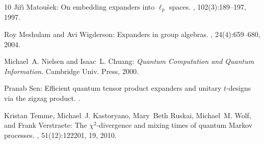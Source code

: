 \documentclass[11pt]{article}
\theoremstyle{plain}
\numberwithin{equation}{section}
\theoremstyle{definition}
\begin{document}
\begin{thebibliography}{10}
{\sc Ji\v{r}\'{\i} Matou\v{s}ek}: On embedding expanders into {$\ell_p$}
  spaces.
, 102(3):189--197, 1997.
\newblock [\epfmtdoi{10.1007/BF02773799}]

{\sc Roy Meshulam and Avi Wigderson}: Expanders in group algebras.
, 24(4):659--680, 2004.
\newblock [\epfmtdoi{10.1007/s00493-004-0040-9}]

{\sc Michael~A. Nielsen and Isaac~L. Chuang}: {\em Quantum Computation and
  Quantum Information}.
\newblock Cambridge Univ. Press, 2000.

{\sc Pranab Sen}: Efficient quantum tensor product expanders and unitary
  $t$-designs via the zigzag product.
.

{\sc Kristan Temme, Michael~J. Kastoryano, Mary~Beth Ruskai, Michael~M. Wolf,
  and Frank Verstraete}: The {$\chi^2$}-divergence and mixing times of quantum
  {M}arkov processes.
, 51(12):122201, 19, 2010.
\newblock [\epfmtdoi{10.1063/1.3511335}]

\end{thebibliography}
\end{document}
